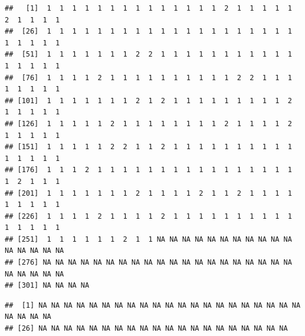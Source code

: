 \documentclass[
]{book}
\newenvironment{Shaded}{\begin{snugshade}}{\end{snugshade}}
\newcommand{\CommentTok}[1]{\textcolor[rgb]{0.56,0.35,0.01}{\textit{#1}}}
\newcommand{\DecValTok}[1]{\textcolor[rgb]{0.00,0.00,0.81}{#1}}
\newcommand{\FunctionTok}[1]{\textcolor[rgb]{0.00,0.00,0.00}{#1}}
\newcommand{\NormalTok}[1]{#1}
\newcommand{\SpecialCharTok}[1]{\textcolor[rgb]{0.00,0.00,0.00}{#1}}
\newcommand{\StringTok}[1]{\textcolor[rgb]{0.31,0.60,0.02}{#1}}
\begin{document}
\begin{Shaded}
\end{Shaded}

\begin{verbatim}
##   [1]  1  1  1  1  1  1  1  1  1  1  1  1  1  1  2  1  1  1  1  1  2  1  1  1  1
##  [26]  1  1  1  1  1  1  1  1  1  1  1  1  1  1  1  1  1  1  1  1  1  1  1  1  1
##  [51]  1  1  1  1  1  1  1  2  2  1  1  1  1  1  1  1  1  1  1  1  1  1  1  1  1
##  [76]  1  1  1  1  2  1  1  1  1  1  1  1  1  1  1  2  2  1  1  1  1  1  1  1  1
## [101]  1  1  1  1  1  1  1  2  1  2  1  1  1  1  1  1  1  1  1  2  1  1  1  1  1
## [126]  1  1  1  1  1  2  1  1  1  1  1  1  1  1  2  1  1  1  1  2  1  1  1  1  1
## [151]  1  1  1  1  1  2  2  1  1  2  1  1  1  1  1  1  1  1  1  1  1  1  1  1  1
## [176]  1  1  1  2  1  1  1  1  1  1  1  1  1  1  1  1  1  1  1  1  1  2  1  1  1
## [201]  1  1  1  1  1  1  1  2  1  1  1  1  2  1  1  2  1  1  1  1  1  1  1  1  1
## [226]  1  1  1  1  2  1  1  1  1  2  1  1  1  1  1  1  1  1  1  1  1  1  1  1  1
## [251]  1  1  1  1  1  1  2  1  1 NA NA NA NA NA NA NA NA NA NA NA NA NA NA NA NA
## [276] NA NA NA NA NA NA NA NA NA NA NA NA NA NA NA NA NA NA NA NA NA NA NA NA NA
## [301] NA NA NA NA
\end{verbatim}

\begin{Shaded}
\end{Shaded}

\begin{verbatim}
##  [1] NA NA NA NA NA NA NA NA NA NA NA NA NA NA NA NA NA NA NA NA NA NA NA NA NA
## [26] NA NA NA NA NA NA NA NA NA NA NA NA NA NA NA NA NA NA NA NA
\end{verbatim}

\begin{Shaded}
\end{Shaded}
\end{document}
